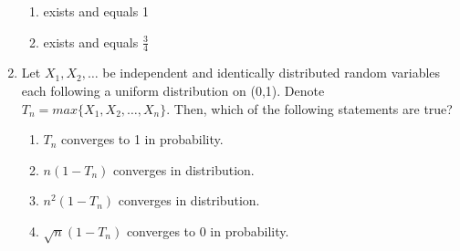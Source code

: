 \begin{enumerate}[label=\thesection.\arabic*.,ref=\thesection.\theenumi]
\begin{enumerate}
    \item exists and equals 1
    \item exists and equals $\frac{3}{4}$
\end{enumerate}
%
\solution

%
%
\item Let $X_{1},X_{2},\dots$ be independent and identically distributed random variables each following a uniform distribution on (0,1). Denote $T_{n}=max\{ X_{1},X_{2},\dots,X_{n}\}$. Then, which of the following statements are true?
\begin{enumerate}
    \item $T_{n}$ converges to 1 in probability.
    \item $n(1-T_{n})$ converges in distribution.
    \item $n^{2}(1-T_{n})$ converges in distribution.
    \item $\sqrt{n}(1-T_{n})$ converges to 0 in probability.
\end{enumerate}
%
\solution



%
\end{enumerate}